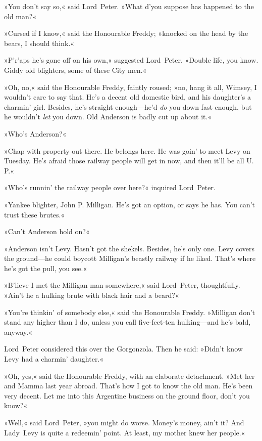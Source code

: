 »You don't say so,« said Lord~Peter. »What d'you suppose has happened to the old man?«

»Cursed if I know,« said the Honourable Freddy; »knocked on the head by the bears, I should think.«

»P'r'aps he's gone off on his own,« suggested Lord~Peter. »Double life, you know. Giddy old blighters, some of these City men.«

»Oh, no,« said the Honourable Freddy, faintly roused; »no, hang it all, Wimsey, I wouldn't care to say that. He's a decent old domestic bird, and his daughter's a charmin' girl. Besides, he's straight enough—he'd \textit{do} you down fast enough, but he wouldn't \textit{let} you down. Old Anderson is badly cut up about it.«

»Who's Anderson?«

»Chap with property out there. He belongs here. He was goin' to meet Levy on Tuesday. He's afraid those railway people will get in now, and then it'll be all U. P.«

»Who's runnin' the railway people over here?« inquired Lord~Peter.

»Yankee blighter, John P. Milligan. He's got an option, or says he has. You can't trust these brutes.«

»Can't Anderson hold on?«

»Anderson isn't Levy. Hasn't got the shekels. Besides, he's only one. Levy covers the ground—he could boycott Milligan's beastly railway if he liked. That's where he's got the pull, you see.«

»B'lieve I met the Milligan man somewhere,« said Lord~Peter, thoughtfully. »Ain't he a hulking brute with black hair and a beard?«

»You're thinkin' of somebody else,« said the Honourable Freddy. »Milligan don't stand any higher than I do, unless you call five-feet-ten hulking—and he's bald, anyway.«

Lord~Peter considered this over the Gorgonzola. Then he said: »Didn't know Levy had a charmin' daughter.«

»Oh, yes,« said the Honourable Freddy, with an elaborate detachment. »Met her and Mamma last year abroad. That's how I got to know the old man. He's been very decent. Let me into this Argentine business on the ground floor, don't you know?«

»Well,« said Lord~Peter, »you might do worse. Money's money, ain't it? And Lady~Levy is quite a redeemin' point. At least, my mother knew her people.«


